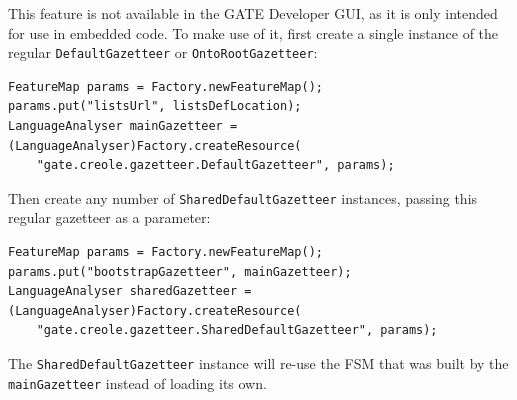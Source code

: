 This feature is not available in the GATE Developer GUI, as it is only intended
for use in embedded code.  To make use of it, first create a single instance
of the regular \texttt{DefaultGazetteer} or \texttt{OntoRootGazetteer}:
%
\begin{small}\begin{verbatim}
FeatureMap params = Factory.newFeatureMap();
params.put("listsUrl", listsDefLocation);
LanguageAnalyser mainGazetteer = (LanguageAnalyser)Factory.createResource(
    "gate.creole.gazetteer.DefaultGazetteer", params);
\end{verbatim}\end{small}

Then create any number of \texttt{SharedDefaultGazetteer} instances, passing
this regular gazetteer as a parameter:
%
\begin{small}\begin{verbatim}
FeatureMap params = Factory.newFeatureMap();
params.put("bootstrapGazetteer", mainGazetteer);
LanguageAnalyser sharedGazetteer = (LanguageAnalyser)Factory.createResource(
    "gate.creole.gazetteer.SharedDefaultGazetteer", params);
\end{verbatim}\end{small}

The \texttt{SharedDefaultGazetteer} instance will re-use the FSM that was built
by the \texttt{mainGazetteer} instead of loading its own.
